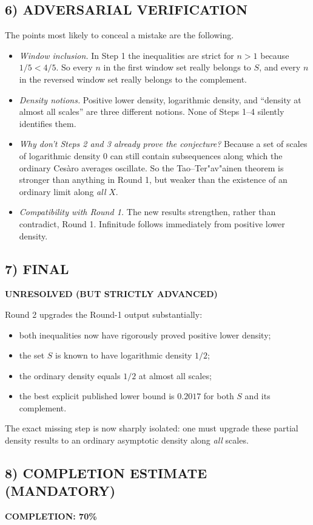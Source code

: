 \subsection*{6) ADVERSARIAL VERIFICATION}
The points most likely to conceal a mistake are the following.
\begin{itemize}
\item \emph{Window inclusion.} In Step 1 the inequalities are strict for $n>1$ because $1/5<4/5$. So every $n$ in the first window set really belongs to $S$, and every $n$ in the reversed window set really belongs to the complement.
\item \emph{Density notions.} Positive lower density, logarithmic density, and ``density at almost all scales'' are three different notions. None of Steps 1--4 silently identifies them.
\item \emph{Why don't Steps 2 and 3 already prove the conjecture?} Because a set of scales of logarithmic density $0$ can still contain subsequences along which the ordinary Ces\`aro averages oscillate. So the Tao--Ter"av"ainen theorem is stronger than anything in Round 1, but weaker than the existence of an ordinary limit along \emph{all} $X$.
\item \emph{Compatibility with Round 1.} The new results strengthen, rather than contradict, Round 1. Infinitude follows immediately from positive lower density.
\end{itemize}

\subsection*{7) FINAL}
\textbf{UNRESOLVED (BUT STRICTLY ADVANCED)}

Round 2 upgrades the Round-1 output substantially:
\begin{itemize}
\item both inequalities now have rigorously proved positive lower density;
\item the set $S$ is known to have logarithmic density $1/2$;
\item the ordinary density equals $1/2$ at almost all scales;
\item the best explicit published lower bound is $0.2017$ for both $S$ and its complement.
\end{itemize}
The exact missing step is now sharply isolated: one must upgrade these partial density results to an ordinary asymptotic density along \emph{all} scales.

\subsection*{8) COMPLETION ESTIMATE (MANDATORY)}
\textbf{COMPLETION: 70\%}

